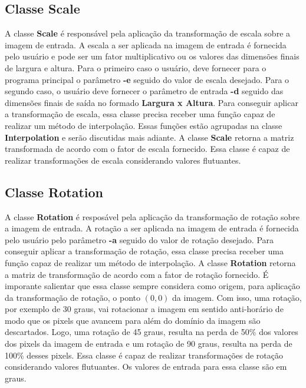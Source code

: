 \documentclass{article}
\begin{document}
%
\subsection{Classe Scale}
A classe \textbf{Scale} é responsável pela aplicação da transformação de escala sobre a imagem de entrada. A escala a ser aplicada na imagem de entrada é fornecida pelo usuário e pode ser um fator multiplicativo ou os valores das dimensões finais de largura e altura. Para o primeiro caso o usuário, deve fornecer para o programa principal o parâmetro \textbf{-e} seguido do valor de escala desejado. Para o segundo caso, o usuário deve fornecer o parâmetro de entrada \textbf{-d} seguido das dimensões finais de saída no formado \textbf{Largura x Altura}. Para conseguir aplicar a transformação de escala, essa classe precisa receber uma função capaz de realizar um método de interpolação. Essas funções estão agrupadas na classe \textbf{Interpolation} e serão discutidas mais adiante. A classe \textbf{Scale} retorna a matriz transformada de acordo com o fator de escala fornecido. Essa classe é capaz de realizar transformações de escala considerando valores flutuantes.

%
\subsection{Classe Rotation}
A classe \textbf{Rotation} é resposável pela aplicação da transformação de rotação sobre a imagem de entrada. A rotação a ser aplicada na imagem de entrada é fornecida pelo usuário pelo parâmetro \textbf{-a} seguido do valor de rotação desejado. Para conseguir aplicar a transformação de rotação, essa classe precisa receber uma função capaz de realizar um método de interpolação. A classe \textbf{Rotation} retorna a matriz de transformação de acordo com a fator de rotação fornecido. É imporante salientar que essa classe sempre considera como origem, para aplicação da transformação de rotação, o ponto $(0,0)$ da imagem. Com isso, uma rotação, por exemplo de 30 graus, vai rotacionar a imagem em sentido anti-horário de modo que os pixels que avancem para além do domínio da imagem são descartados. Logo, uma rotação de 45 graus, resulta na perda de 50\% dos valores dos pixels da imagem de entrada e um rotação de 90 graus, resulta na perda de 100\% desses pixels. Essa classe é capaz de realizar transformações de rotação considerando valores flutuantes. Os valores de entrada para essa classe são em graus.

%
\end{document}
